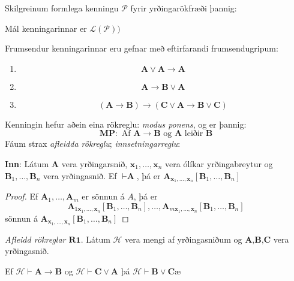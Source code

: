 \documentclass[12pt]{article}
\begin{document}
\begin{skgr}
  Skilgreinum formlega kenningu $\mathcal{P}$ fyrir yrðingarökfræði þannig:
  \begin{anum}
  \item Mál kenningarinnar er $\mathcal{L(P))}$
  \item Frumsendur kenningarinnar eru gefnar með eftirfarandi frumsendugripum:
    \begin{enumerate}[label=\textbf{F}\arabic*]
    \item \[ \textbf{A} \vee \textbf{A} \rightarrow \textbf{A} \]
    \item \[ \textbf{A} \rightarrow \textbf{B} \vee \textbf{A} \]
    \item \[ ( \textbf{A} \rightarrow \textbf{B}) \rightarrow (\textbf{C} \vee \textbf{A} \rightarrow \textbf{B} \vee \textbf{C})\]
    \end{enumerate}
  \item Kenningin hefur aðein eina rökreglu: \emph{modus ponens}, og er þannig:
    \[ \textbf{MP}: \text{ Af } \textbf{A} \rightarrow \textbf{B} \text{ og } \textbf{A} \text{ leiðir } \textbf{B}\]
    Fáum strax \emph{afleidda rökreglu}; \emph{innsetningarreglu}:

    \textbf{Inn}: Látum \textbf{A} vera yrðingarsnið, $ \textbf{x}_1, \dotsc, \textbf{x}_n$
    vera ólíkar yrðingabreytur og $ \textbf{B}_1, \dotsc, \textbf{B}_n$ vera
    yrðingasnið. Ef $\vdash \textbf{A}$, þá er $\textbf{A}_{\textbf{x}_1, \dotsc, \textbf{x}_n}[\textbf{B}_1, \dotsc, \textbf{B}_n]$
    \begin{proof}
      Ef $\textbf{A}_1, \dotsc, \textbf{A}_m$ er sönnun á $A$, þá er
      \[\textbf{A}_{ 1 \textbf{x}_1, \dotsc, \textbf{x}_n}[\textbf{B}_1, \dotsc, \textbf{B}_n], \dotsc, \textbf{A}_{m \textbf{x}_1, \dotsc, \textbf{x}_n}[\textbf{B}_1, \dotsc, \textbf{B}_n]\]
      sönnun á $\textbf{A}_{\textbf{x}_1, \dotsc, \textbf{x}_n}[\textbf{B}_1, \dotsc, \textbf{B}_n]$

    \end{proof}

  \end{anum}
\end{skgr}

\emph{Afleidd rökreglar $\textbf{R1}$}. Látum $\mathcal{H}$ vera mengi af yrðingasniðum
og $\textbf{A,B,C}$ vera yrðingasnið.

Ef $\mathcal{H} \vdash \textbf{A} \rightarrow \textbf{B}$ og $\mathcal{H} \vdash \textbf{C} \vee \textbf{A}$
þá $\mathcal{H} \vdash \textbf{B} \vee \textbf{C}$æ
\end{document}
